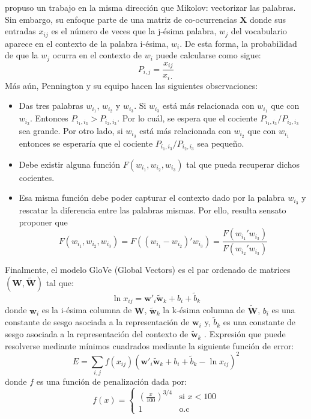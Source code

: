 \cite{pennington2014glove} propuso un trabajo en la misma dirección que Mikolov: vectorizar las palabras. Sin embargo, su enfoque parte de una matriz de co-ocurrencias $\mathbf{X}$ donde sus entradas $x_{ij}$ es el número de veces que la j-ésima palabra, $w_j$ del vocabulario aparece en el contexto de la palabra i-ésima, $w_i$. De esta forma, la probabilidad de que la $w_j$ ocurra en el contexto de $w_i$ puede calcularse como sigue:
$$P_{i,j} = \frac{x_{ij}}{x_{i\cdot}}$$
Más aún, Pennington y su equipo hacen las siguientes observaciones:
\begin{itemize}
	\item Das tres palabras $w_{i_1}$, $w_{i_2}$ y $w_{i_3}$. Si $w_{i_3}$ está más relacionada con $w_{i_1}$ que con $w_{i_2}$. Entonces $P_{i_1,i_3} > P_{i_2,i_3}$. Por lo cuál,  se espera que el cociente $P_{i_1,i_3}/P_{i_2,i_3}$ sea grande. Por otro lado, si $w_{i_3}$ está más relacionada con $w_{i_2}$ que con $w_{i_1}$ entonces se esperaría que el cociente $P_{i_1,i_3}/P_{i_2,i_3}$ sea pequeño.
	
	\item Debe existir alguna función $F\left(w_{i_1},w_{i_2},w_{i_3}\right)$ tal que pueda recuperar dichos cocientes. 
	
	\item Esa misma función debe poder capturar el contexto dado por la palabra $w_{i_3}$ y rescatar la diferencia entre las palabras mismas. Por ello, resulta sensato proponer que $$F\left(w_{i_1},w_{i_2},w_{i_3}\right)= F\left(\left(w_{i_1}-w_{i_2}\right)'w_{i_3}\right) = \frac{F\left(w_{i_1}'w_{i_3}\right)}{F\left(w_{i_2}'w_{i_3}\right)}$$
\end{itemize}

Finalmente, el modelo GloVe (Global Vectors) es el par ordenado de matrices $\left(\mathbf{W},\tilde{\mathbf{W}}\right)$ tal que:
\begin{equation}
	\label{eq:glove}
	\ln x_{ij} = \mathbf{w}'_i\tilde{\mathbf{w}}_k + b_i + \tilde{b}_k 
\end{equation}
donde $\mathbf{w}_i$ es la i-ésima columna de $\mathbf{W}$, $\tilde{\mathbf{w}}_k$ la k-ésima columna de $\tilde{\mathbf{W}}$, $b_i$ es una constante de sesgo asociada a la representación de $\mathbf{w}_i$ y, $\tilde{b}_k$ es una constante de sesgo asociada a la representación del contexto de $\tilde{\mathbf{w}}_k$ . Expresión que puede resolverse mediante mínimos cuadrados mediante la siguiente función de error:
\begin{equation}
	\label{eq:glovels}
	E = \sum_{i,j} f\left(x_{ij}\right)\left(\mathbf{w}'_i\tilde{\mathbf{w}}_k + b_i + \tilde{b}_k - \ln x_{ij}\right)^2 
\end{equation}
donde $f$ es una función de penalización dada por:
\begin{equation}
	f(x) = \left\lbrace\begin{array}{ll}
		\left(\frac{x}{100} \right)^{3/4}& \mbox{si } x < 100\\
		1 & \mbox{o.c}
	\end{array} \right.
\end{equation}

